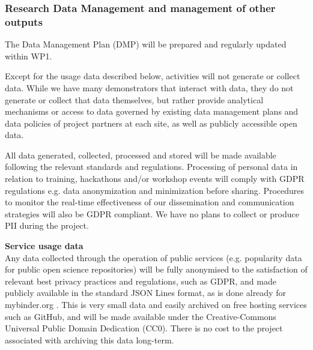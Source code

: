 \subsubsection{Research Data Management and management of other outputs}

The Data Management Plan (DMP) will be prepared and regularly updated within WP1.

Except for the usage data described below,
\TheProject activities will not generate or collect data.
While we have many demonstrators that interact with data, they do not generate or collect that
data themselves, but rather provide analytical mechanisms or access to data governed by
existing data management plans and data policies of project partners at each site,
as well as publicly accessible open data.

All data generated, collected, processed and stored will be made available following the
relevant standards and regulations. Processing of personal data in relation to training,
hackathons and/or workshop events will comply with GDPR regulations e.g. data
anonymization and minimization before sharing.
Procedures to monitor the real-time effectiveness of our dissemination and
communication strategies will also be GDPR compliant.
We have no plans to collect or produce PII during the project.

\noindent \textbf{Service usage data} \\
Any data collected through the operation of public services
(e.g. popularity data for public open science repositories)
will be fully anonymised to the satisfaction of relevant best privacy practices and regulations, such as GDPR,
and made publicly available in the standard JSON Lines format,
as is done already for mybinder.org \cite{mybinder-archive}.
This is very small data and easily archived on free hosting services such as GitHub,
and will be made available under the Creative-Commons Universal Public Domain Dedication (CC0).
There is no cost to the project associated with archiving this data long-term.



